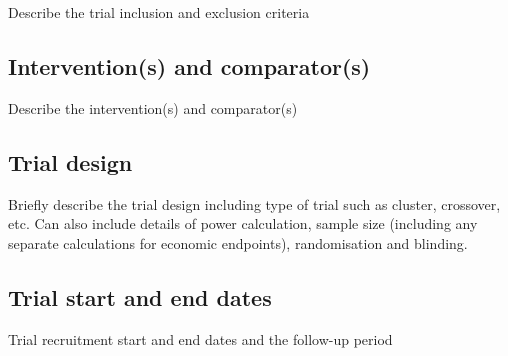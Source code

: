 Describe the trial inclusion and exclusion criteria



\subsection{Intervention(s) and comparator(s)}

Describe the intervention(s) and comparator(s)



\subsection{Trial design}

Briefly describe the trial design including type of trial such as
cluster, crossover, etc. Can also include details of power
calculation, sample size (including any separate calculations for
economic endpoints), randomisation and blinding.



\subsection{Trial start and end dates}

Trial recruitment start and end dates and the follow-up period

